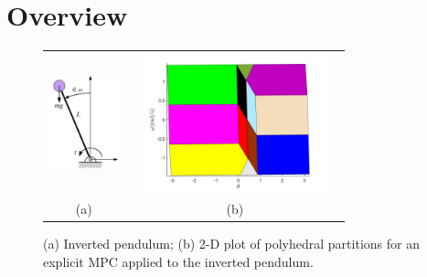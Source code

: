 \section{Overview}
\label{sec:example}

% 


\begin{figure}[t]
	\begin{tabular}{cc}
	\includegraphics[width=2cm,height=3cm]{Figs/inv_pend.png}&	\includegraphics[width=6cm,height=4cm]{Figs/regs.jpg}\\
	(a)&(b)
	\end{tabular}
	\caption{(a) Inverted pendulum; (b) 2-D plot of polyhedral partitions for an explicit MPC applied to the inverted pendulum.}
	\label{fig:inverted_pendulum}
\end{figure}

